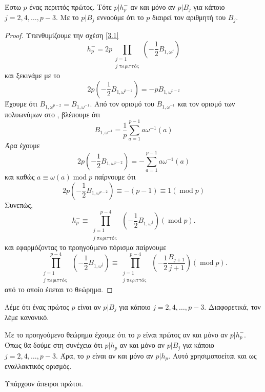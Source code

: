 \begin{theorem}
	Έστω $p$ ένας περιττός πρώτος. Τότε $p|h_p^-$ αν και μόνο αν $p|B_j$ για κάποιο $j=2,4,\ldots,p-3$. Με το $p|B_j$ εννοούμε ότι το $p$ διαιρεί τον αριθμητή του $B_j$.
\end{theorem}

\begin{proof} Υπενθυμίζουμε την σχέση \ref{3.1}
	$$h^-_p = 2p \prod\limits_{\substack{j = 1 \\ j \text{ περιττός}}} \left(-\frac{1}{2} B_{1,\omega^j}\right)$$
	και ξεκινάμε με το
	$$2p \left(-\frac12 B_{1,\omega^{p-2}}\right) = -pB_{1,\omega^{p-2}}$$
	Έχουμε ότι $B_{1,\omega^{p-2}} = B_{1,\omega^{-1}}$. Από τον ορισμό του $B_{1,\omega^{-1}}$ και τον ορισμό των  πολυωνύμων στο \cite{Wash}, βλέπουμε ότι
	$$B_{1,\omega^{-1}} = \frac1p \sum\limits_{a=1}^{p-1} a \omega^{-1}(a)$$ Άρα έχουμε
	$$2p\left(-\frac12 B_{1,\omega^{p-2}}\right) = - \sum\limits_{a=1}^{p-1}a\omega^{-1}(a)$$ και καθώς $a \equiv \omega(a) \operatorname{mod}p$ παίρνουμε ότι
	$$2p \left(-\frac12 B_{1,\omega^{p-2}}\right) \equiv -(p-1) \equiv 1(\operatorname{mod}p)$$
	Συνεπώς,
	$$h^-_p \equiv \prod\limits_{\substack{j=1 \\ j \text{ περιττός }}}^{p-4} \left(-\frac12 B_{1,\omega^j}\right) (\operatorname{mod}p).$$ και εφαρμόζοντας το προηγούμενο πόρισμα παίρνουμε
	$$ \prod\limits_{\substack{j=1 \\ j \text{ περιττός }}}^{p-4} \left(-\frac12 B_{1,\omega^j}\right) \equiv  \prod\limits_{\substack{j=1 \\ j \text{ περιττός }}}^{p-4} \left(-\frac12 \frac{B_{j+1}}{j+1}\right)(\operatorname{mod}p).$$ από το οποίο έπεται το θεώρημα.
\end{proof}


\begin{defn}
	Λέμε ότι ένας πρώτος $p$ είναι  αν $p|B_j$ για κάποιο $j=2,4,\ldots,p-3$. Διαφορετικά, τον λέμε κανονικό.
\end{defn}

\noindent Με το προηγούμενο θεώρημα έχουμε ότι το $p$ είναι  πρώτος αν και μόνο αν $p|h^-_p$. Όπως θα δούμε στη 
συνέχεια ότι $p|h_p$ αν και μόνο αν $p|B_j$ για κάποιο $j=2,4,\ldots,p-3$. Άρα, το $p$ είναι  αν και μόνο αν $p|h_p$. Αυτό χρησιμοποείται και ως εναλλακτικός ορισμός.

\begin{theorem}
	Υπάρχουν άπειροι  πρώτοι.
\end{theorem}

